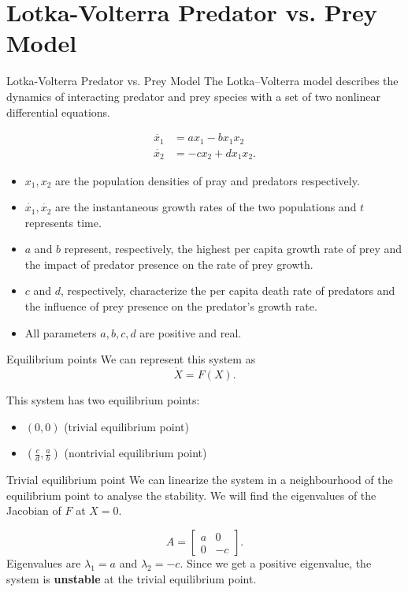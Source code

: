 \documentclass{beamer}
\begin{document}
\section{Lotka-Volterra Predator vs. Prey Model}
\begin{frame}{Lotka-Volterra Predator vs. Prey Model}
    The Lotka–Volterra model describes the dynamics of interacting predator and prey species with a set of two nonlinear differential equations.

    \begin{align*}
  \dot{x_1} &= ax_1-bx_1x_2\\
  \dot{x_2} &= -cx_2 + dx_1x_2.
\end{align*}

\begin{itemize}
    \item $x_1,x_2$ are the population densities of pray and predators respectively.
    \item $\dot{x_1},\dot{x_2}$ are the instantaneous growth rates of the two populations and $t$ represents time.
    \item $a$ and $b$ represent, respectively, the highest per capita growth rate of prey and the impact of predator presence on the rate of prey growth.
    \item $c$ and $d$, respectively, characterize the per capita death rate of predators and the influence of prey presence on the predator's growth rate.
    \item All parameters $a,b,c,d$ are positive and real.
\end{itemize}

\end{frame}

\begin{frame}{Equilibrium points}
    We can represent this system as
\begin{equation}\label{lotka}
    \dot{X}=F(X).
\end{equation}

This system has two equilibrium points: 

\begin{itemize}
    \item $(0,0)$ (trivial equilibrium point) 
    \item $(\frac{c}{d},\frac{a}{b})$ (nontrivial equilibrium point)
\end{itemize}
\end{frame}

\begin{frame}{Trivial equilibrium point}
    We can linearize the system in a neighbourhood of the equilibrium point to analyse the stability. We will find the eigenvalues of the Jacobian of $F$ at $X=0.$

    \[
A =  \begin{bmatrix}
    a & 0 \\
    0 & -c
\end{bmatrix}.
\]
Eigenvalues are $\lambda_1=a$ and $\lambda_2=-c.$ Since we get a positive eigenvalue, the system is \textbf{unstable} at the trivial equilibrium point. 
\end{frame}
\end{document}
